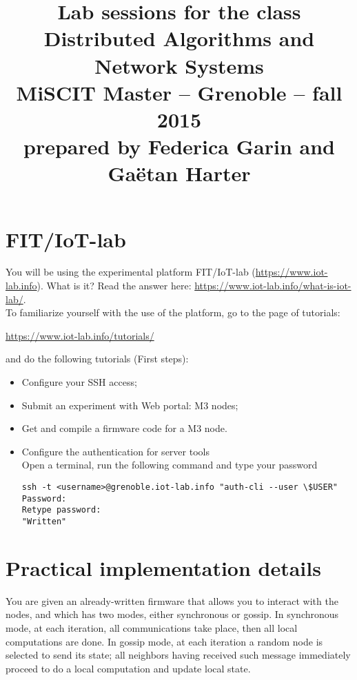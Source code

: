 \documentclass{article}
\begin{document}
\title{
{\normalsize Lab sessions for the class}\\[-1mm]
Distributed Algorithms and Network Systems\\[-2mm]
{\normalsize MiSCIT Master -- Grenoble -- fall 2015}\\[-1mm]
{\normalsize prepared by Federica Garin and Ga\"{e}tan Harter}}
\date{}
\maketitle

\vspace{-2cm}
\section{FIT/IoT-lab}
You will be using the experimental platform FIT/IoT-lab (\url{https://www.iot-lab.info}).
What is it? Read the answer here: \url{https://www.iot-lab.info/what-is-iot-lab/}.\\

To familiarize yourself with the use of the platform, go to the page of tutorials:
\begin{center} \url{https://www.iot-lab.info/tutorials/} \end{center}
and do the following tutorials (First steps):
\begin{itemize}
\item Configure your SSH access;
\item Submit an experiment with Web portal: M3 nodes;
\item Get and compile a firmware code for a M3 node.

\item Configure the authentication for server tools\\
    Open a terminal, run the following command and type your password
\begin{verbatim}ssh -t <username>@grenoble.iot-lab.info "auth-cli --user \$USER"
Password:
Retype password:
"Written"
\end{verbatim}
\end{itemize}



\section{Practical implementation details}

You are given an already-written firmware that allows you to interact with the nodes, and which has two modes, either synchronous or gossip. In synchronous mode, at each iteration, all communications take place, then all local computations are done. In gossip mode, at each iteration a random node is selected to send its state; all neighbors having received such message immediately proceed to do a local computation and update local state.
\end{document}
